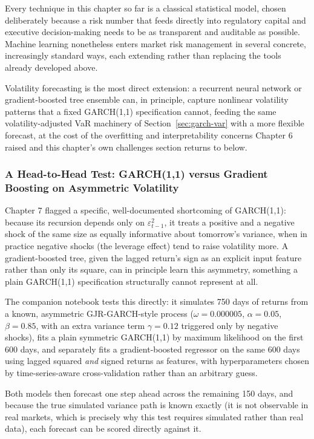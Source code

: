 \documentclass[../ai_in_finance]{subfiles}
\begin{document}
Every technique in this chapter so far is a classical statistical model, chosen deliberately because a risk number that feeds directly into regulatory capital and executive decision-making needs to be as transparent and auditable as possible. Machine learning nonetheless enters market risk management in several concrete, increasingly standard ways, each extending rather than replacing the tools already developed above.

Volatility forecasting is the most direct extension: a recurrent neural network or gradient-boosted tree ensemble can, in principle, capture nonlinear volatility patterns that a fixed GARCH(1,1) specification cannot, feeding the same volatility-adjusted VaR machinery of Section~\ref{sec:garch-var} with a more flexible forecast, at the cost of the overfitting and interpretability concerns Chapter 6 raised and this chapter's own challenges section returns to below.

\subsubsection*{A Head-to-Head Test: GARCH(1,1) versus Gradient Boosting on Asymmetric Volatility}
\label{sec:ml-vol-forecast}

Chapter 7 flagged a specific, well-documented shortcoming of GARCH(1,1): because its recursion depends only on $\varepsilon_{t-1}^2$, it treats a positive and a negative shock of the same size as equally informative about tomorrow's variance, when in practice negative shocks (the leverage effect) tend to raise volatility more. A gradient-boosted tree, given the lagged return's sign as an explicit input feature rather than only its square, can in principle learn this asymmetry, something a plain GARCH(1,1) specification structurally cannot represent at all.

The companion notebook tests this directly: it simulates 750 days of returns from a known, asymmetric GJR-GARCH-style process ($\omega=0.000005$, $\alpha=0.05$, $\beta=0.85$, with an extra variance term $\gamma=0.12$ triggered only by negative shocks), fits a plain symmetric GARCH(1,1) by maximum likelihood on the first 600 days, and separately fits a gradient-boosted regressor on the same 600 days using lagged squared \emph{and} signed returns as features, with hyperparameters chosen by time-series-aware cross-validation rather than an arbitrary guess.

Both models then forecast one step ahead across the remaining 150 days, and because the true simulated variance path is known exactly (it is not observable in real markets, which is precisely why this test requires simulated rather than real data), each forecast can be scored directly against it.
\end{document}
